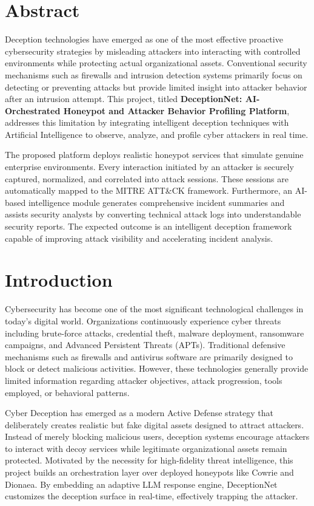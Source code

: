 \documentclass[12pt,a4paper]{report}
\begin{document}
\section{Abstract}
Deception technologies have emerged as one of the most effective proactive cybersecurity strategies by misleading attackers into interacting with controlled environments while protecting actual organizational assets. Conventional security mechanisms such as firewalls and intrusion detection systems primarily focus on detecting or preventing attacks but provide limited insight into attacker behavior after an intrusion attempt. This project, titled \textbf{DeceptionNet: AI-Orchestrated Honeypot and Attacker Behavior Profiling Platform}, addresses this limitation by integrating intelligent deception techniques with Artificial Intelligence to observe, analyze, and profile cyber attackers in real time. 

The proposed platform deploys realistic honeypot services that simulate genuine enterprise environments. Every interaction initiated by an attacker is securely captured, normalized, and correlated into attack sessions. These sessions are automatically mapped to the MITRE ATT\&CK framework. Furthermore, an AI-based intelligence module generates comprehensive incident summaries and assists security analysts by converting technical attack logs into understandable security reports. The expected outcome is an intelligent deception framework capable of improving attack visibility and accelerating incident analysis.

\section{Introduction}
Cybersecurity has become one of the most significant technological challenges in today's digital world. Organizations continuously experience cyber threats including brute-force attacks, credential theft, malware deployment, ransomware campaigns, and Advanced Persistent Threats (APTs). Traditional defensive mechanisms such as firewalls and antivirus software are primarily designed to block or detect malicious activities. However, these technologies generally provide limited information regarding attacker objectives, attack progression, tools employed, or behavioral patterns. 

Cyber Deception has emerged as a modern Active Defense strategy that deliberately creates realistic but fake digital assets designed to attract attackers. Instead of merely blocking malicious users, deception systems encourage attackers to interact with decoy services while legitimate organizational assets remain protected. Motivated by the necessity for high-fidelity threat intelligence, this project builds an orchestration layer over deployed honeypots like Cowrie and Dionaea. By embedding an adaptive LLM response engine, DeceptionNet customizes the deception surface in real-time, effectively trapping the attacker.
\end{document}
